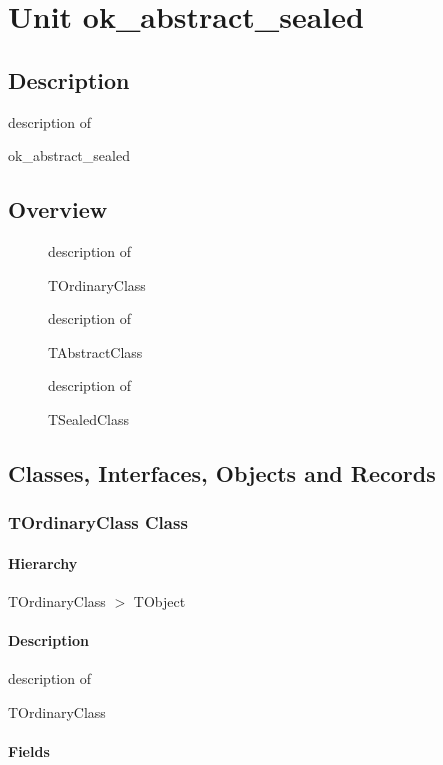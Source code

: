 \documentclass{report}
\begin{document}
\newlength{\tmplength}
\chapter{Unit ok{\_}abstract{\_}sealed}
\section{Description}
description of \begin{ttfamily}ok{\_}abstract{\_}sealed\end{ttfamily}
\section{Overview}
\begin{description}
\item[\texttt{\begin{ttfamily}TOrdinaryClass\end{ttfamily} Class}]description of \begin{ttfamily}TOrdinaryClass\end{ttfamily}
\item[\texttt{\begin{ttfamily}TAbstractClass\end{ttfamily} Class}]description of \begin{ttfamily}TAbstractClass\end{ttfamily}
\item[\texttt{\begin{ttfamily}TSealedClass\end{ttfamily} Class}]description of \begin{ttfamily}TSealedClass\end{ttfamily}
\end{description}
\section{Classes, Interfaces, Objects and Records}
\subsection*{TOrdinaryClass Class}
\subsubsection*{\large{\textbf{Hierarchy}}\normalsize\hspace{1ex}\hfill}
TOrdinaryClass {$>$} TObject
\subsubsection*{\large{\textbf{Description}}\normalsize\hspace{1ex}\hfill}
description of \begin{ttfamily}TOrdinaryClass\end{ttfamily}\subsubsection*{\large{\textbf{Fields}}\normalsize\hspace{1ex}\hfill}
\end{document}
